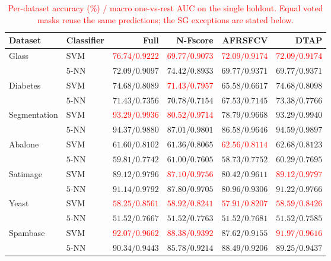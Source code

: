 \documentclass[]{interact}
\theoremstyle{plain}
\theoremstyle{definition}
\theoremstyle{remark}
\begin{document}
\begin{table}[htbp]
\centering\small\setlength{\tabcolsep}{4pt}
\caption{\textcolor{red}{Per-dataset accuracy (\%) / macro one-vs-rest AUC on the single holdout. Equal voted masks reuse the same predictions; the SG exceptions are stated below.}}\label{tab:acc}
\begin{tabular}{llrrrr}
\toprule
Dataset & Classifier & Full & N-Fscore & AFRSFCV & DTAP \\
\midrule
Glass & SVM & \leavevmode\textcolor{red}{$76.74/0.9222$} & \leavevmode\textcolor{red}{$69.77/0.9073$} & \leavevmode\textcolor{red}{$72.09/0.9174$} & \leavevmode\textcolor{red}{$72.09/0.9174$} \\
 & $5$-NN & $72.09/0.9097$ & $74.42/0.8933$ & $69.77/0.9371$ & $69.77/0.9371$ \\
Diabetes & SVM & $74.68/0.8089$ & \leavevmode\textcolor{red}{$71.43/0.7957$} & $65.58/0.6617$ & $74.68/0.8098$ \\
 & $5$-NN & $71.43/0.7356$ & $70.78/0.7154$ & $67.53/0.7145$ & $73.38/0.7766$ \\
Segmentation & SVM & \leavevmode\textcolor{red}{$93.29/0.9936$} & \leavevmode\textcolor{red}{$80.52/0.9714$} & $78.79/0.9668$ & $93.29/0.9940$ \\
 & $5$-NN & $94.37/0.9880$ & $87.01/0.9801$ & $86.58/0.9646$ & $94.59/0.9897$ \\
Abalone & SVM & $61.60/0.8102$ & $61.36/0.8065$ & \leavevmode\textcolor{red}{$62.56/0.8114$} & $62.68/0.8123$ \\
 & $5$-NN & $59.81/0.7742$ & $61.00/0.7605$ & $58.73/0.7752$ & $60.29/0.7695$ \\
Satimage & SVM & $89.12/0.9796$ & \leavevmode\textcolor{red}{$87.10/0.9756$} & $80.42/0.9611$ & \leavevmode\textcolor{red}{$89.12/0.9797$} \\
 & $5$-NN & $91.14/0.9792$ & $87.80/0.9705$ & $80.96/0.9306$ & $91.22/0.9766$ \\
Yeast & SVM & \leavevmode\textcolor{red}{$58.25/0.8561$} & \leavevmode\textcolor{red}{$58.92/0.8241$} & \leavevmode\textcolor{red}{$57.91/0.8207$} & \leavevmode\textcolor{red}{$58.59/0.8426$} \\
 & $5$-NN & $51.52/0.7667$ & $51.52/0.7763$ & $51.52/0.7681$ & $51.52/0.7585$ \\
Spambase & SVM & \leavevmode\textcolor{red}{$92.07/0.9662$} & \leavevmode\textcolor{red}{$88.38/0.9392$} & $87.62/0.9155$ & \leavevmode\textcolor{red}{$91.97/0.9616$} \\
 & $5$-NN & $90.34/0.9443$ & $85.78/0.9214$ & $88.49/0.9206$ & $89.25/0.9437$ \\

\end{tabular}
\end{table}
\end{document}

